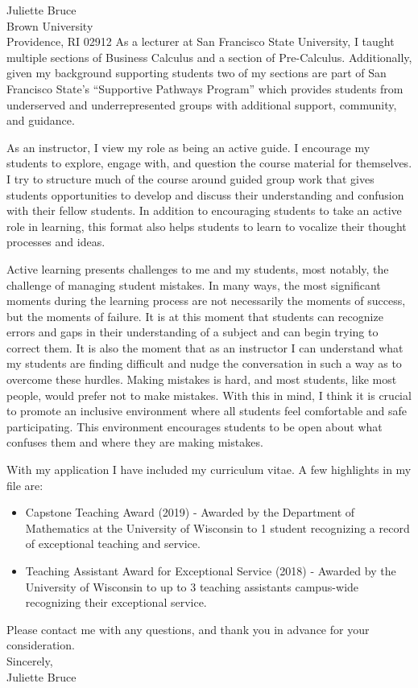 \documentclass[11pt]{brownletter}
\begin{document}
\begin{letter}{Juliette Bruce\\ 
               Brown University\\ 
               Providence, RI 02912}
As a lecturer at San Francisco State University, I taught multiple sections of Business Calculus and a section of Pre-Calculus. Additionally, given my background supporting students two of my sections are part of San Francisco State's ``Supportive Pathways Program'' which provides students from underserved and underrepresented groups with additional support, community, and guidance. 


As an instructor, I view my role as being an active guide. I encourage my students to explore, engage with, and question the course material for themselves. I try to structure much of the course around guided group work that gives students opportunities to develop and discuss their understanding and confusion with their fellow students. In addition to encouraging students to take an active role in learning, this format also helps students to learn to vocalize their thought processes and ideas.

Active learning presents challenges to me and my students, most notably, the challenge of managing student mistakes. In many ways, the most significant moments during the learning process are not necessarily the moments of success, but the moments of failure. It is at this moment that students can recognize errors and gaps in their understanding of a subject and can begin trying to correct them. It is also the moment that as an instructor I can understand what my students are finding difficult and nudge the conversation in such a way as to overcome these hurdles.
Making mistakes is hard, and most students, like most people, would prefer not to make mistakes. With this in mind, I think it is crucial to promote an inclusive environment where all students feel comfortable and safe participating. This environment encourages students to be open about what confuses them and where they are making mistakes.

With my application I have included my curriculum vitae. A few highlights in my file are:
\begin{itemize}

\item Capstone Teaching Award (2019) - Awarded by the Department of Mathematics at the University of Wisconsin to 1 student recognizing a record of exceptional teaching and service.
\item Teaching Assistant Award for Exceptional Service  (2018) - Awarded by the University of Wisconsin to up to 3 teaching assistants campus-wide recognizing their exceptional service.

\end{itemize}

Please contact me with any questions, and thank you in advance for your consideration.
\vspace{.1 in}
\\
Sincerely,
\\
Juliette Bruce




\end{letter}
\end{document}
